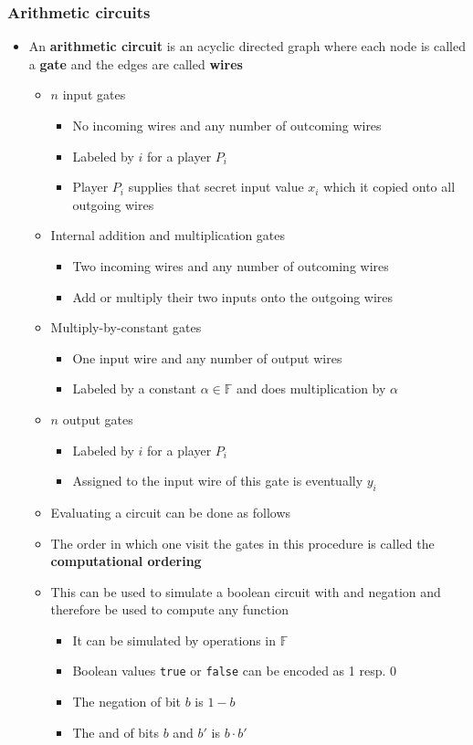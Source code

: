 \subsubsection{Arithmetic circuits}
\begin{itemize}
  \item An \textbf{arithmetic circuit} is an acyclic directed graph where each node is called a \textbf{gate} and the edges are called \textbf{wires}
  \begin{itemize}
    \item $n$ input gates
    \begin{itemize}
      \item No incoming wires and any number of outcoming wires
      \item Labeled by $i$ for a player $P_i$
      \item Player $P_i$ supplies that secret input value $x_i$ which it copied onto all outgoing wires
    \end{itemize}
    \item Internal addition and multiplication gates
    \begin{itemize}
      \item Two incoming wires and any number of outcoming wires
      \item Add or multiply their two inputs onto the outgoing wires
    \end{itemize}
    \item Multiply-by-constant gates
    \begin{itemize}
      \item One input wire and any number of output wires
      \item Labeled by a constant $\alpha \in \mathbb F$ and does multiplication by $\alpha$
    \end{itemize}
    \item $n$ output gates
    \begin{itemize}
      \item Labeled by $i$ for a player $P_i$
      \item Assigned to the input wire of this gate is eventually $y_i$
    \end{itemize}
  	\item Evaluating a circuit can be done as follows
  	\item The order in which one visit the gates in this procedure is called the \textbf{computational ordering}
  	\item This can be used to simulate a boolean circuit with and negation and therefore be used to compute any function
    \begin{itemize}
  		\item It can be simulated by operations in $\mathbb F$
  		\item Boolean values \texttt{true} or \texttt{false} can be encoded as 1 resp. 0
  		\item The negation of bit $b$ is $1-b$
  		\item The and of bits $b$ and $b'$ is $b \cdot b'$
    \end{itemize}
  \end{itemize}
   

\end{itemize}
